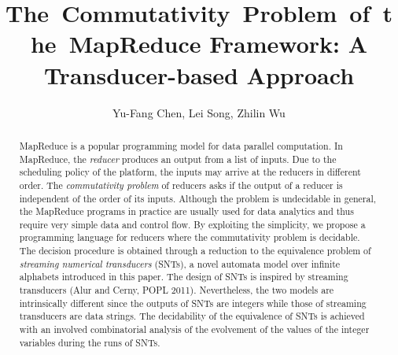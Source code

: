 \documentclass[runningheads,a4paper]{llncs}
\title{The~Commutativity~Problem~of~the~MapReduce Framework: A Transducer-based Approach}
\institute{Academia Sinica \and Chinese Academy of Sciences }
\author{Yu-Fang Chen\inst{1}, Lei Song\inst{2}, Zhilin Wu\inst{2}}
\begin{document}
\maketitle

\begin{abstract}

MapReduce is a popular programming model for data parallel computation. 
In MapReduce, the \emph{reducer} produces an output from a list of inputs. Due to the scheduling policy of the platform, the inputs may arrive at the reducers in different order. The \emph{commutativity problem} of reducers asks if the output of a reducer is independent of the order of its inputs. Although the problem is undecidable in general,
the MapReduce programs in practice are usually used for data analytics and thus require very simple data and control flow. 
By exploiting the simplicity, we propose a programming language for reducers where the commutativity problem is decidable.
The decision procedure is obtained through a reduction to the equivalence problem of \emph{streaming numerical transducers} (SNTs), a novel automata model over infinite alphabets introduced in this paper. The design of SNTs is inspired by streaming transducers (Alur and Cerny, POPL 2011). Nevertheless, the two models are intrinsically different since the outputs of SNTs are integers while those of streaming transducers are data strings. 
The decidability of the equivalence of SNTs is achieved with an involved combinatorial analysis of the evolvement of the values of the integer variables during the runs of SNTs.
\end{abstract}

\vspace{-0.8cm}


\vspace{-0.3cm}


\vspace{-0.3cm}


\vspace{-0.3cm}


\vspace{-0.3cm}



\vspace{-0.3cm}

\vspace{-0.2cm}

\vspace{-0.5cm}





\newpage


\end{document}
